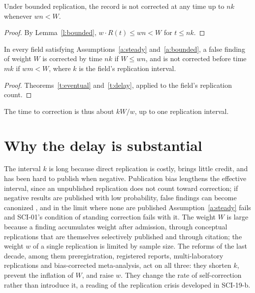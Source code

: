 \documentclass{situationist-preprint}
\begin{document}
\begin{theorem}[Delay]\label{t:delay}
Under bounded replication, the record is not corrected at any time up to $nk$ whenever $wn < W$.
\end{theorem}

\begin{proof}
By Lemma~\ref{l:bounded}, $w\cdot R(t) \le wn < W$ for $t \le nk$.
\end{proof}

\begin{theorem}\label{t:main}
In every field satisfying Assumptions~\ref{a:steady} and~\ref{a:bounded}, a false finding of weight $W$ is corrected by time $nk$ if $W \le wn$, and is not corrected before time $mk$ if $wm < W$, where $k$ is the field's replication interval.
\end{theorem}

\begin{proof}
Theorems~\ref{t:eventual} and~\ref{t:delay}, applied to the field's replication count.
\end{proof}

The time to correction is thus about $kW/w$, up to one replication interval.

\section{Why the delay is substantial}

The interval $k$ is long because direct replication is costly, brings little credit, and has been hard to publish when negative. Publication bias lengthens the effective interval, since an unpublished replication does not count toward correction; if negative results are published with low probability, false findings can become canonized \citep{Nissen2016}, and in the limit where none are published Assumption~\ref{a:steady} fails and SCI-01's condition of standing correction fails with it. The weight $W$ is large because a finding accumulates weight after admission, through conceptual replications that are themselves selectively published and through citation; the weight $w$ of a single replication is limited by sample size. The reforms of the last decade, among them preregistration, registered reports, multi-laboratory replications and bias-corrected meta-analysis, act on all three: they shorten $k$, prevent the inflation of $W$, and raise $w$. They change the rate of self-correction rather than introduce it, a reading of the replication crisis developed in SCI-19-b.
\end{document}
